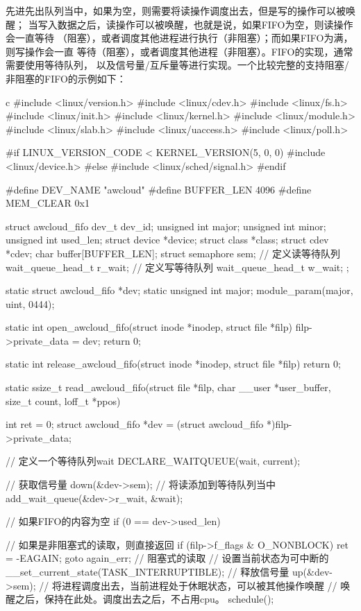 先进先出队列当中，如果为空，则需要将读操作调度出去，但是写的操作可以被唤醒；
当写入数据之后，读操作可以被唤醒，也就是说，如果FIFO为空，则读操作会一直等待
（阻塞），或者调度其他进程进行执行（非阻塞）；而如果FIFO为满，则写操作会一直
等待（阻塞），或者调度其他进程（非阻塞）。FIFO的实现，通常需要使用等待队列，
以及信号量/互斥量等进行实现。一个比较完整的支持阻塞/非阻塞的FIFO的示例如下：
\begin{code-block}{c}
#include <linux/version.h>
#include <linux/cdev.h>
#include <linux/fs.h>
#include <linux/init.h>
#include <linux/kernel.h>
#include <linux/module.h>
#include <linux/slab.h>
#include <linux/uaccess.h>
#include <linux/poll.h>

#if LINUX_VERSION_CODE < KERNEL_VERSION(5, 0, 0)
#include <linux/device.h>
#else
#include <linux/sched/signal.h>
#endif

#define DEV_NAME "awcloud"
#define BUFFER_LEN 4096
#define MEM_CLEAR 0x1

struct awcloud_fifo {
        dev_t             dev_id;
        unsigned int      major;
        unsigned int      minor;
        unsigned int      used_len;
        struct device     *device;
        struct class      *class;
        struct cdev       *cdev;
        char              buffer[BUFFER_LEN];
        struct semaphore  sem;
        // 定义读等待队列
        wait_queue_head_t r_wait;
        // 定义写等待队列
        wait_queue_head_t w_wait;
};

static struct awcloud_fifo *dev;
static unsigned int major;
module_param(major, uint, 0444);

static int open_awcloud_fifo(struct inode *inodep, struct file *filp)
{
        filp->private_data = dev;
        return 0;
}

static int release_awcloud_fifo(struct inode *inodep, struct file *filp)
{
        return 0;
}

static ssize_t read_awcloud_fifo(struct file *filp,
        char __user *user_buffer, size_t count, loff_t *ppos)
{
        int ret = 0;
        struct awcloud_fifo *dev = (struct awcloud_fifo *)filp->private_data;

        // 定义一个等待队列wait
        DECLARE_WAITQUEUE(wait, current);

        // 获取信号量
        down(&dev->sem);
        // 将读添加到等待队列当中
        add_wait_queue(&dev->r_wait, &wait);

        // 如果FIFO的内容为空
        if (0 == dev->used_len) {
                // 如果是非阻塞式的读取，则直接返回
                if (filp->f_flags & O_NONBLOCK) {
                        ret = -EAGAIN;
                        goto again_err;
                }
                // 阻塞式的读取
                // 设置当前状态为可中断的
                __set_current_state(TASK_INTERRUPTIBLE);
                // 释放信号量
                up(&dev->sem);
                // 将进程调度出去，当前进程处于休眠状态，可以被其他操作唤醒
                // 唤醒之后，保持在此处。调度出去之后，不占用cpu。
                schedule();

}}
\end{code-block}
